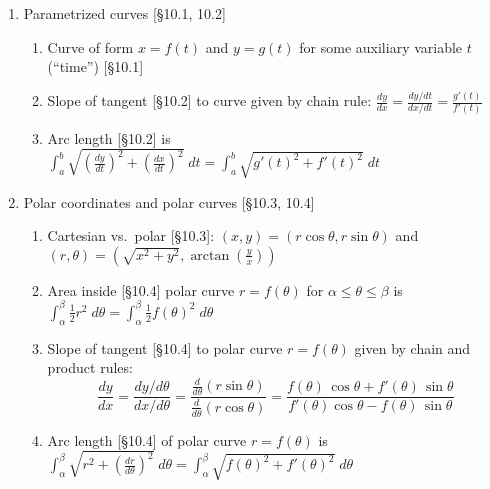 \documentclass[11pt]{article}
\begin{document}
\begin{enumerate}
\item Parametrized curves [\S10.1, 10.2]
\begin{enumerate}
\item Curve of form $x=f(t)$ and $y=g(t)$ for some auxiliary variable $t$ (``time'') [\S10.1]
\item Slope of tangent [\S10.2] to curve given by chain rule: $\frac{dy}{dx} = \frac{dy/dt}{dx/dt} = \frac{g'(t)}{f'(t)}$ 
\item Arc length [\S10.2] is {\small $\int_{a}^{b} \sqrt{(\frac{dy}{dt})^2 + (\frac{dx}{dt})^2} \; dt = \int_{a}^{b} \sqrt{g'(t)^2 + f'(t)^2} \; dt$}
\end{enumerate}

\item Polar coordinates and polar curves [\S10.3, 10.4]
\begin{enumerate}
\item Cartesian vs.~polar [\S10.3]: $(x,y) = (r\cos \theta, r \sin \theta)$ and $(r,\theta) = (\sqrt{x^2+y^2}, \arctan (\frac{y}{x}))$
\item Area inside [\S10.4] polar curve $r=f(\theta)$ for $\alpha \leq \theta \leq \beta$ is $\int_{\alpha}^{\beta} \frac{1}{2} r^2 \; d\theta=\int_{\alpha}^{\beta} \frac{1}{2} f(\theta)^2 \; d\theta$ 
\item Slope of tangent [\S10.4] to polar curve $r=f(\theta)$ given by chain and product rules: 
{\small \[\frac{dy}{dx} = \frac{dy/d\theta}{dx/d\theta} = \frac{\frac{d}{d\theta}(r \sin\theta)}{\frac{d}{d\theta}(r \cos\theta)} = \frac{f(\theta)\, \cos \theta  + f'(\theta) \, \sin \theta}{f'(\theta)\cos\theta-f(\theta)\, \sin\theta }\]}

\vspace{-0.2cm}
\item Arc length [\S10.4] of polar curve $r=f(\theta)$ is {\small $\int_{\alpha}^{\beta} \sqrt{r^2 + (\frac{dr}{d\theta})^2} \; d\theta = \int_{\alpha}^{\beta} \sqrt{f(\theta)^2 + f'(\theta)^2} \; d\theta$ }
\end{enumerate}


\end{enumerate}
\end{document}
